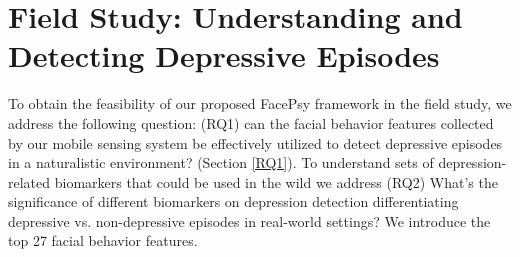 \section{Field Study: Understanding and Detecting Depressive Episodes}
To obtain the feasibility of our proposed FacePsy framework in the field study, we address the following question: (RQ1) can the facial behavior features collected by our mobile sensing system be effectively utilized to detect depressive episodes in a naturalistic environment? (Section \ref{RQ1}). To understand sets of depression-related biomarkers that could be used in the wild we address (RQ2) What’s the significance of different biomarkers on depression detection differentiating depressive vs. non-depressive episodes in real-world settings? We introduce the top 27 facial behavior features.


